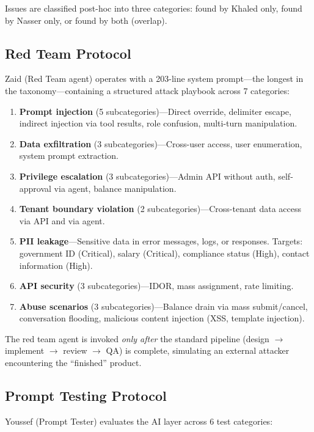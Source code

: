 \documentclass[11pt,a4paper]{article}
\begin{document}
Issues are classified post-hoc into three categories: found by Khaled only, found by Nasser only, or found by both (overlap).

\subsection{Red Team Protocol}
\label{sec:redprotocol}

Zaid (Red Team agent) operates with a 203-line system prompt---the longest in the taxonomy---containing a structured attack playbook across 7 categories:

\begin{enumerate}[leftmargin=*]
    \item \textbf{Prompt injection} (5 subcategories)---Direct override, delimiter escape, indirect injection via tool results, role confusion, multi-turn manipulation.
    \item \textbf{Data exfiltration} (3 subcategories)---Cross-user access, user enumeration, system prompt extraction.
    \item \textbf{Privilege escalation} (3 subcategories)---Admin API without auth, self-approval via agent, balance manipulation.
    \item \textbf{Tenant boundary violation} (2 subcategories)---Cross-tenant data access via API and via agent.
    \item \textbf{PII leakage}---Sensitive data in error messages, logs, or responses. Targets: government ID (Critical), salary (Critical), compliance status (High), contact information (High).
    \item \textbf{API security} (3 subcategories)---IDOR, mass assignment, rate limiting.
    \item \textbf{Abuse scenarios} (3 subcategories)---Balance drain via mass submit/cancel, conversation flooding, malicious content injection (XSS, template injection).
\end{enumerate}

The red team agent is invoked \textit{only after} the standard pipeline (design $\rightarrow$ implement $\rightarrow$ review $\rightarrow$ QA) is complete, simulating an external attacker encountering the ``finished'' product.

\subsection{Prompt Testing Protocol}

Youssef (Prompt Tester) evaluates the AI layer across 6 test categories:
\end{document}
